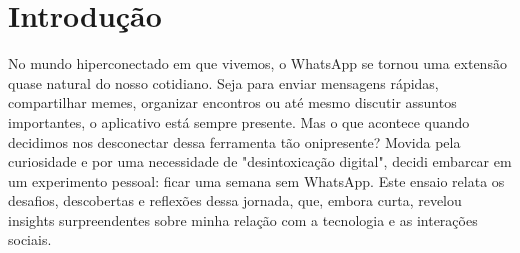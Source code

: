 \chapter{Introdução}\label{capitulo1}
No mundo hiperconectado em que vivemos, o WhatsApp se tornou uma extensão quase natural do nosso cotidiano. Seja para enviar mensagens rápidas, compartilhar memes, organizar encontros ou até mesmo discutir assuntos importantes, o aplicativo está sempre presente. Mas o que acontece quando decidimos nos desconectar dessa ferramenta tão onipresente? Movida pela curiosidade e por uma necessidade de "desintoxicação digital", decidi embarcar em um experimento pessoal: ficar uma semana sem WhatsApp. Este ensaio relata os desafios, descobertas e reflexões dessa jornada, que, embora curta, revelou insights surpreendentes sobre minha relação com a tecnologia e as interações sociais.